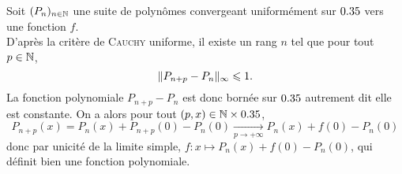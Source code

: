 \begin{preuve}
    Soit $(P_n)_{n \in \mathbb{N}}$ une suite de polynômes convergeant uniformément sur $0.35$ vers une fonction $f$. \\
    D'après la critère de \textsc{Cauchy} uniforme, il existe un rang $n$ tel que pour tout $p \in \mathbb{N}$, 
    $$\Vert P_{n+p} - P_n \Vert_\infty \leqslant 1.$$
    La fonction polynomiale $P_{n+p} - P_n$ est donc bornée sur $0.35$ autrement dit elle est constante. On a alors pour tout $(p, x) \in \mathbb{N} \times 0.35$,
    $$P_{n+p}(x) = P_n(x) + P_{n+p}(0) - P_n(0) \xrightarrow[p \to + \infty]{} P_n(x) + f(0) - P_n(0)$$
    donc par unicité de la limite simple, $f : x \mapsto P_n(x) + f(0) - P_n(0)$, qui définit bien une fonction polynomiale. 
\end{preuve}